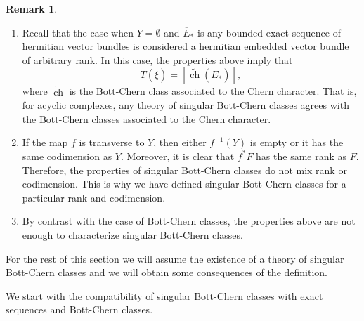 \documentclass[10pt,twoside]{article}
\numberwithin{equation}{section}
\theoremstyle{plain}
\theoremstyle{definition}
\newtheorem{remark}[equation]{Remark}
\DeclareMathOperator{\ch}{ch}
\begin{document}
\begin{remark}
  \label{rem:1}
  \begin{enumerate}
  \item Recall that the case when $Y=\emptyset$ and $\overline
    E_{\ast}$ is any bounded exact 
    sequence of hermitian vector bundles is considered a hermitian
    embedded vector bundle of arbitrary rank. In this case, the
    properties above imply that
    \begin{displaymath}
      T(\overline \xi)=[\widetilde{\ch}(\overline E_{\ast})],
    \end{displaymath}
    where $\widetilde {\ch}$ is the Bott-Chern class associated to the
    Chern character.
    That is, for acyclic complexes, any theory of singular Bott-Chern
    classes agrees with the Bott-Chern
    classes associated to the Chern character.
  \item If the map $f$ is transverse to $Y$, then either $f^{-1}(Y)$ is
    empty or it has the same codimension as $Y$. Moreover, it is clear
    that $f^{\ast}F$ has the same rank as $F$. Therefore, the
    properties of singular Bott-Chern classes do not mix rank or
    codimension. This 
    is why we have defined singular Bott-Chern classes for a particular
    rank and codimension.
  \item By contrast with the case of Bott-Chern classes, the
    properties above are not enough to characterize singular
    Bott-Chern classes.
  \end{enumerate}
\end{remark}

For the rest of this section we will assume the existence of a theory
of singular Bott-Chern classes and we will obtain some consequences
of the definition. 

We start with the compatibility of singular Bott-Chern classes with
exact sequences and Bott-Chern classes. 
\end{document}
